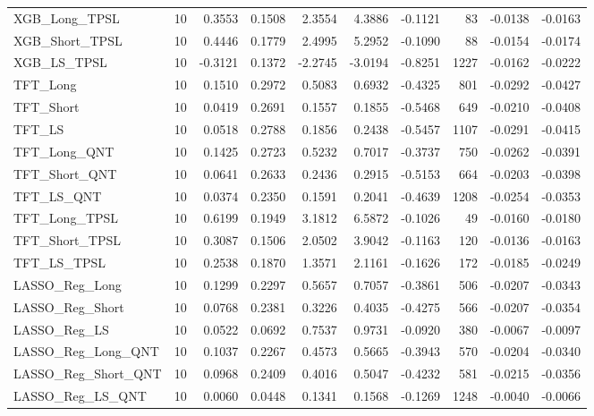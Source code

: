\begin{tabular}{llrrrrrrrr}
\cline{1-10}
XGB\_Long\_TPSL & 10 & 0.3553 & 0.1508 & 2.3554 & 4.3886 & -0.1121 & 83 & -0.0138 & -0.0163 \\
\cline{1-10}
XGB\_Short\_TPSL & 10 & 0.4446 & 0.1779 & 2.4995 & 5.2952 & -0.1090 & 88 & -0.0154 & -0.0174 \\
\cline{1-10}
XGB\_LS\_TPSL & 10 & -0.3121 & 0.1372 & -2.2745 & -3.0194 & -0.8251 & 1227 & -0.0162 & -0.0222 \\
\cline{1-10}
TFT\_Long & 10 & 0.1510 & 0.2972 & 0.5083 & 0.6932 & -0.4325 & 801 & -0.0292 & -0.0427 \\
\cline{1-10}
TFT\_Short & 10 & 0.0419 & 0.2691 & 0.1557 & 0.1855 & -0.5468 & 649 & -0.0210 & -0.0408 \\
\cline{1-10}
TFT\_LS & 10 & 0.0518 & 0.2788 & 0.1856 & 0.2438 & -0.5457 & 1107 & -0.0291 & -0.0415 \\
\cline{1-10}
TFT\_Long\_QNT & 10 & 0.1425 & 0.2723 & 0.5232 & 0.7017 & -0.3737 & 750 & -0.0262 & -0.0391 \\
\cline{1-10}
TFT\_Short\_QNT & 10 & 0.0641 & 0.2633 & 0.2436 & 0.2915 & -0.5153 & 664 & -0.0203 & -0.0398 \\
\cline{1-10}
TFT\_LS\_QNT & 10 & 0.0374 & 0.2350 & 0.1591 & 0.2041 & -0.4639 & 1208 & -0.0254 & -0.0353 \\
\cline{1-10}
TFT\_Long\_TPSL & 10 & 0.6199 & 0.1949 & 3.1812 & 6.5872 & -0.1026 & 49 & -0.0160 & -0.0180 \\
\cline{1-10}
TFT\_Short\_TPSL & 10 & 0.3087 & 0.1506 & 2.0502 & 3.9042 & -0.1163 & 120 & -0.0136 & -0.0163 \\
\cline{1-10}
TFT\_LS\_TPSL & 10 & 0.2538 & 0.1870 & 1.3571 & 2.1161 & -0.1626 & 172 & -0.0185 & -0.0249 \\
\cline{1-10}
LASSO\_Reg\_Long & 10 & 0.1299 & 0.2297 & 0.5657 & 0.7057 & -0.3861 & 506 & -0.0207 & -0.0343 \\
\cline{1-10}
LASSO\_Reg\_Short & 10 & 0.0768 & 0.2381 & 0.3226 & 0.4035 & -0.4275 & 566 & -0.0207 & -0.0354 \\
\cline{1-10}
LASSO\_Reg\_LS & 10 & 0.0522 & 0.0692 & 0.7537 & 0.9731 & -0.0920 & 380 & -0.0067 & -0.0097 \\
\cline{1-10}
LASSO\_Reg\_Long\_QNT & 10 & 0.1037 & 0.2267 & 0.4573 & 0.5665 & -0.3943 & 570 & -0.0204 & -0.0340 \\
\cline{1-10}
LASSO\_Reg\_Short\_QNT & 10 & 0.0968 & 0.2409 & 0.4016 & 0.5047 & -0.4232 & 581 & -0.0215 & -0.0356 \\
\cline{1-10}
LASSO\_Reg\_LS\_QNT & 10 & 0.0060 & 0.0448 & 0.1341 & 0.1568 & -0.1269 & 1248 & -0.0040 & -0.0066 \\

\end{tabular}
